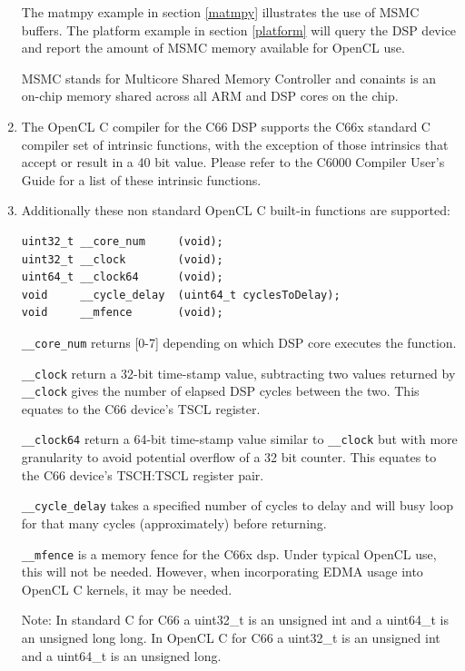 \documentclass[10pt]{article}
\begin{document}
\begin{enumerate}
The matmpy example in section \ref{matmpy} illustrates the use of MSMC
buffers.  The platform example in section \ref{platform} will query the DSP
device and report the amount of MSMC memory available for OpenCL use.

MSMC stands for Multicore Shared Memory Controller and conaints is an 
on-chip memory shared across all ARM and DSP cores on the chip.

\item The OpenCL C compiler for the C66 DSP supports the C66x standard C compiler set of intrinsic functions, with the exception of those intrinsics that accept or result in a 40 bit value.  Please refer to the C6000 Compiler User's Guide for a list of these intrinsic functions.

\item Additionally these non standard OpenCL C built-in functions are supported:

\begin{verbatim}
uint32_t __core_num     (void);
uint32_t __clock        (void);
uint64_t __clock64      (void);
void     __cycle_delay  (uint64_t cyclesToDelay);
void     __mfence       (void);
\end{verbatim}

    \verb!__core_num! returns [0-7] depending on which DSP core executes the
    function.

    \verb!__clock! return a 32-bit time-stamp value, subtracting two values returned
    by \verb!__clock! gives the number of elapsed DSP cycles between the two.
    This equates to the C66 device's TSCL register.

    \verb!__clock64! return a 64-bit time-stamp value similar to \verb!__clock! but with more
    granularity to avoid potential overflow of a 32 bit counter.
    This equates to the C66 device's TSCH:TSCL register pair.

    \verb!__cycle_delay! takes a specified number of cycles to delay and will busy
    loop for that many cycles (approximately) before returning.

    \verb!__mfence! is a memory fence for the C66x dsp.  Under typical OpenCL use,
    this will not be needed.  However, when incorporating EDMA usage into
    OpenCL C kernels, it may be needed.

    Note: In standard C for C66 a uint32\_t is an unsigned int and a uint64\_t is an
    unsigned long long.  In OpenCL C for C66 a uint32\_t is an unsigned int and
    a uint64\_t is an unsigned long.


\end{enumerate}
\end{document}
